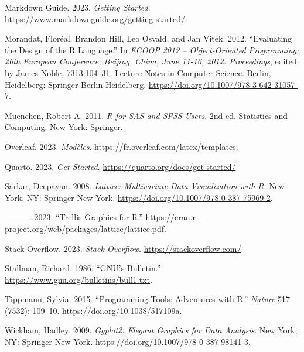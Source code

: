 \documentclass[
  letterpaper,
]{scrbook}
\newlength{\cslhangindent}
\newlength{\cslentryspacingunit} %
\newenvironment{CSLReferences}[2] %
 {%
  \setlength{\parindent}{0pt}
  \ifodd #1
  \let\oldpar\par
  \def\par{\hangindent=\cslhangindent\oldpar}
  \fi
  \setlength{\parskip}{#2\cslentryspacingunit}
 }%
 {}
\begin{document}
\begin{CSLReferences}{1}{0}
\leavevmode{}%
Markdown Guide. 2023. \emph{Getting {Started}}.
\url{https://www.markdownguide.org/getting-started/}.

\leavevmode{}%
Morandat, Floréal, Brandon Hill, Leo Osvald, and Jan Vitek. 2012.
{``Evaluating the {Design} of the {R Language}.''} In \emph{{ECOOP} 2012
-- {Object-Oriented Programming}: 26th {European Conference}, {Beijing},
{China}, {June} 11-16, 2012. {Proceedings}}, edited by James Noble,
7313:104--31. Lecture {Notes} in {Computer Science}. {Berlin,
Heidelberg}: {Springer Berlin Heidelberg}.
\url{https://doi.org/10.1007/978-3-642-31057-7}.

\leavevmode{}%
Muenchen, Robert A. 2011. \emph{R for {SAS} and {SPSS} Users}. 2nd ed.
Statistics and Computing. {New York}: {Springer}.

\leavevmode{}%
Overleaf. 2023. \emph{Modèles}.
\url{https://fr.overleaf.com/latex/templates}.

\leavevmode{}%
Quarto. 2023. \emph{Get {Started}}.
\url{https://quarto.org/docs/get-started/}.

\leavevmode{}%
Sarkar, Deepayan. 2008. \emph{Lattice: {Multivariate Data Visualization}
with {R}}. {New York, NY}: {Springer New York}.
\url{https://doi.org/10.1007/978-0-387-75969-2}.

\leavevmode{}%
---------. 2023. {``Trellis {Graphics} for {R}.''}
\url{https://cran.r-project.org/web/packages/lattice/lattice.pdf}.

\leavevmode{}%
Stack Overflow. 2023. \emph{Stack {Overflow}}.
\url{https://stackoverflow.com/}.

\leavevmode{}%
Stallman, Richard. 1986. {``GNU's Bulletin.''}
\url{https://www.gnu.org/bulletins/bull1.txt}.

\leavevmode{}%
Tippmann, Sylvia. 2015. {``Programming Tools: {Adventures} with {R}.''}
\emph{Nature} 517 (7532): 109--10.
\url{https://doi.org/10.1038/517109a}.

\leavevmode{}%
Wickham, Hadley. 2009. \emph{Ggplot2: {Elegant Graphics} for {Data
Analysis}}. {New York, NY}: {Springer New York}.
\url{https://doi.org/10.1007/978-0-387-98141-3}.


\end{CSLReferences}
\end{document}
